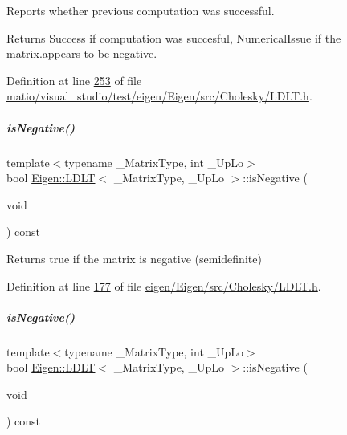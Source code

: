 Reports whether previous computation was successful. 

\begin{DoxyReturn}{Returns}
{\ttfamily Success} if computation was succesful, {\ttfamily Numerical\+Issue} if the matrix.\+appears to be negative. 
\end{DoxyReturn}


Definition at line \hyperlink{matio_2visual__studio_2test_2eigen_2_eigen_2src_2_cholesky_2_l_d_l_t_8h_source_l00253}{253} of file \hyperlink{matio_2visual__studio_2test_2eigen_2_eigen_2src_2_cholesky_2_l_d_l_t_8h_source}{matio/visual\+\_\+studio/test/eigen/\+Eigen/src/\+Cholesky/\+L\+D\+L\+T.\+h}.

\mbox{\label{group___cholesky___module_aabd3e7aebe844034caca4c62dbe9c1eb}} 
\subparagraph{\texorpdfstring{is\+Negative()}{isNegative()}\hspace{0.1cm}{\footnotesize\ttfamily [1/2]}}
{\footnotesize\ttfamily template$<$typename \+\_\+\+Matrix\+Type, int \+\_\+\+Up\+Lo$>$ \\
bool \hyperlink{group___cholesky___module_class_eigen_1_1_l_d_l_t}{Eigen\+::\+L\+D\+LT}$<$ \+\_\+\+Matrix\+Type, \+\_\+\+Up\+Lo $>$\+::is\+Negative (\begin{DoxyParamCaption}\item[{void}]{ }\end{DoxyParamCaption}) const\hspace{0.3cm}{\ttfamily [inline]}}

\begin{DoxyReturn}{Returns}
true if the matrix is negative (semidefinite) 
\end{DoxyReturn}


Definition at line \hyperlink{eigen_2_eigen_2src_2_cholesky_2_l_d_l_t_8h_source_l00177}{177} of file \hyperlink{eigen_2_eigen_2src_2_cholesky_2_l_d_l_t_8h_source}{eigen/\+Eigen/src/\+Cholesky/\+L\+D\+L\+T.\+h}.

\mbox{\label{group___cholesky___module_aabd3e7aebe844034caca4c62dbe9c1eb}} 
\subparagraph{\texorpdfstring{is\+Negative()}{isNegative()}\hspace{0.1cm}{\footnotesize\ttfamily [2/2]}}
{\footnotesize\ttfamily template$<$typename \+\_\+\+Matrix\+Type, int \+\_\+\+Up\+Lo$>$ \\
bool \hyperlink{group___cholesky___module_class_eigen_1_1_l_d_l_t}{Eigen\+::\+L\+D\+LT}$<$ \+\_\+\+Matrix\+Type, \+\_\+\+Up\+Lo $>$\+::is\+Negative (\begin{DoxyParamCaption}\item[{void}]{ }\end{DoxyParamCaption}) const\hspace{0.3cm}{\ttfamily [inline]}}

